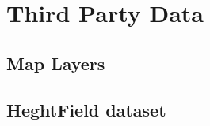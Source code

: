 %
%
%
%



\section{Third Party Data}

\subsection{Map Layers}

\subsection{HeghtField dataset}



\endinput
